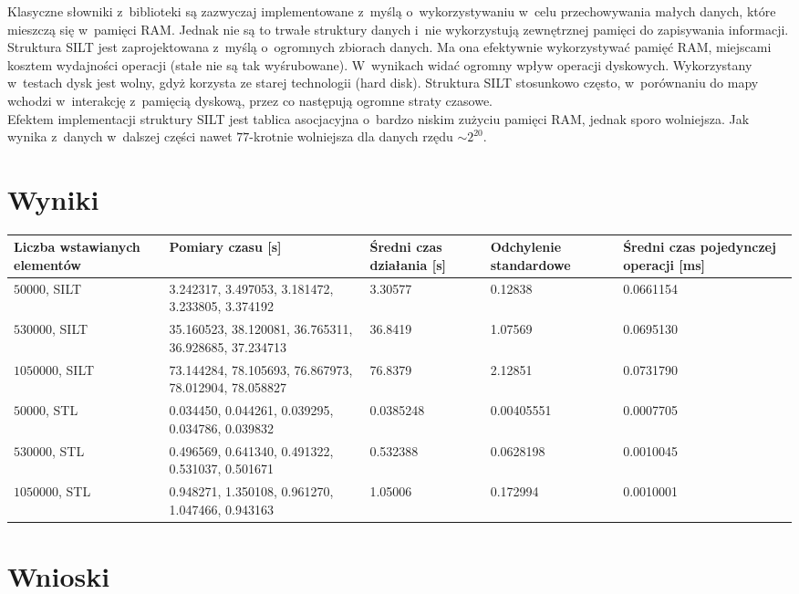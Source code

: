 \documentclass[declaration,shortabstract,masc]{iithesis}
\begin{document}
			\indent Klasyczne słowniki z~biblioteki są zazwyczaj implementowane z~myślą o~wykorzystywaniu w~celu przechowywania małych danych, które mieszczą się w~pamięci RAM. Jednak nie są to trwałe struktury danych i~nie wykorzystują zewnętrznej pamięci do zapisywania informacji. Struktura SILT jest zaprojektowana z~myślą o~ogromnych zbiorach danych. Ma ona efektywnie wykorzystywać pamięć RAM, miejscami kosztem wydajności operacji (stałe nie są tak wyśrubowane). W~wynikach widać ogromny wpływ operacji dyskowych. Wykorzystany w~testach dysk jest wolny, gdyż korzysta ze starej technologii (hard disk). Struktura SILT stosunkowo często, w~porównaniu do mapy wchodzi w~interakcję z~pamięcią dyskową, przez co następują ogromne straty czasowe.\\
			Efektem implementacji struktury SILT jest tablica asocjacyjna o~bardzo niskim zużyciu pamięci RAM, jednak sporo wolniejsza. Jak wynika z~danych w~dalszej części nawet $77$-krotnie wolniejsza dla danych rzędu $\sim2^{20}$.
		\section{Wyniki}
			\begin{tabular}{|p{62pt}|p{62pt}|p{62pt}|p{62pt}|p{62pt}|}
				\hline
				Liczba wstawianych elementów & Pomiary czasu [s] & Średni czas działania [s] & Odchylenie standardowe & Średni czas pojedynczej operacji [ms]\\
				\hline
				$50000$, SILT & 3.242317, 3.497053, 3.181472, 3.233805, 3.374192 & 3.30577 & 0.12838 & 0.0661154\\
				\hline
				$530000$, SILT & 35.160523, 38.120081, 36.765311, 36.928685, 37.234713 & 36.8419 & 1.07569 & 0.0695130\\
				\hline
				$1050000$, SILT & 73.144284, 78.105693, 76.867973, 78.012904, 78.058827 & 76.8379 & 2.12851 & 0.0731790\\
				\hline
				$50000$, STL & 0.034450, 0.044261, 0.039295, 0.034786, 0.039832 & 0.0385248 & 0.00405551 & 0.0007705\\
				\hline
				$530000$, STL & 0.496569, 0.641340, 0.491322, 0.531037, 0.501671 & 0.532388 & 0.0628198 & 0.0010045\\
				\hline
				$1050000$, STL & 0.948271, 1.350108, 0.961270, 1.047466, 0.943163 & 1.05006 & 0.172994 & 0.0010001\\
				\hline
			\end{tabular}
		\section{Wnioski}
\end{document}
